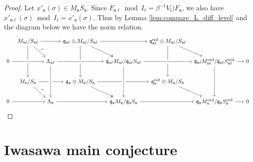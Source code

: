\documentclass[leqno]{amsart}
\theoremstyle{definition}
\theoremstyle{remark}
\newcommand{\fl}{\mathfrak{l}}
\newcommand{\fn}{\mathfrak{n}}
\newcommand{\fq}{\mathfrak{q}}
\newcommand{\red}{\textnormal{red}}
\newcommand{\ord}{\textnormal{ord}} %
\begin{document}
\begin{proof}

Let $x'_{\fn}(\sigma)\in M_{\fn}S_{\fn}$.
Since $F_{\fn\ell}\bmod I_\ell=
\beta^{-1}V_\fl)F_\fn$,
we also have 
$x'_{\fn\ell}(\sigma)\bmod I_\ell
=x'_\fn(\sigma)$.
Thus by Lemma \ref{lem:compare_L_diff_level}
and the diagram below
we have the norm relation.
\begin{equation*}
\begin{tikzcd}[column sep=tiny]
& M_{\fn\ell}/S_{\fn\ell}\arrow{dd} \arrow[rd,"\sim"]\arrow[rr]
&& \fq_{\fn\ell}\otimes M_{\fn\ell}/S_{\fn\ell}
	\arrow[rd,twoheadrightarrow]\arrow[rr]\arrow[dd]
&& \fq_{\fn\ell}^{\red}\otimes M_{\fn\ell}/S_{\fn\ell}\arrow[dd]\arrow[rd]\\
0 \arrow[crossing over]{rr} 
&& \Lambda_{\fn\ell}
	\arrow[crossing over]{dd} \arrow[crossing over]{rr} 
&& \fq_{\fn\ell}M_{\fn\ell}/\fq_{\fn\ell}S_{\fn\ell}
	\arrow[crossing over]{dd}\arrow[crossing over]{rr} 
&& \fq_{\fn\ell}M_{\fn\ell}^{\ord}/\fq_{\fn\ell}S^{\ord}_{\fn\ell}
	\arrow{dd} \arrow[rr] && 0\\
& M_{\fn}/S_{\fn}\arrow{rr}\arrow[rd,"\sim"]
&& \fq_{\fn}\otimes M_{\fn}/S_{\fn}
	\arrow{rr} \arrow[rd,twoheadrightarrow]
&& \fq_{\fn}^{\red}\otimes M_{\fn}/S_{\fn} \arrow[rd]& & & \\
0 \arrow[crossing over]{rr} 
&& \Lambda_{\fn} \arrow[crossing over]{rr} 
&& \fq_{\fn}M_{\fn}/\fq_{\fn}S_{\fn}\arrow[crossing over]{rr} 
&& \fq_{\fn}M_{\fn}^{\ord}/\fq_{\fn}S_{\fn}^{\ord} \arrow[rr] && 0
\arrow[from=2-3,to=4-3,crossing over]
\arrow[from=2-5,to=4-5,crossing over]
\end{tikzcd}
\end{equation*}

	
\end{proof}


\section{Iwasawa main conjecture}
\end{document}
